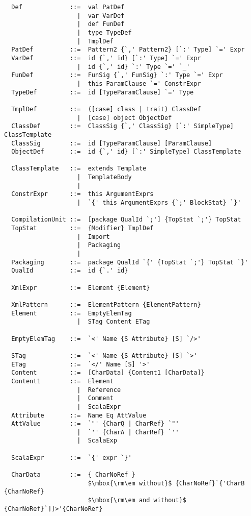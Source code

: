 \begin{lstlisting}
  Def             ::=  val PatDef
                    |  var VarDef
                    |  def FunDef
                    |  type TypeDef
                    |  TmplDef
  PatDef          ::=  Pattern2 {`,' Pattern2} [`:' Type] `=' Expr
  VarDef          ::=  id {`,' id} [`:' Type] `=' Expr
                    |  id {`,' id} `:' Type `=' `_'
  FunDef          ::=  FunSig {`,' FunSig} `:' Type `=' Expr
                    |  this ParamClause `=' ConstrExpr
  TypeDef         ::=  id [TypeParamClause] `=' Type

  TmplDef         ::=  ([case] class | trait) ClassDef
                    |  [case] object ObjectDef
  ClassDef        ::=  ClassSig {`,' ClassSig} [`:' SimpleType] ClassTemplate
  ClassSig        ::=  id [TypeParamClause] [ParamClause]
  ObjectDef       ::=  id {`,' id} [`:' SimpleType] ClassTemplate

  ClassTemplate   ::=  extends Template
                    |  TemplateBody
                    |
  ConstrExpr      ::=  this ArgumentExprs
                    |  `{' this ArgumentExprs {`;' BlockStat} `}'

  CompilationUnit ::=  [package QualId `;'] {TopStat `;'} TopStat
  TopStat         ::=  {Modifier} TmplDef
                    |  Import
                    |  Packaging
                    |
  Packaging       ::=  package QualId `{' {TopStat `;'} TopStat `}'
  QualId          ::=  id {`.' id}

  XmlExpr         ::=  Element {Element}

  XmlPattern      ::=  ElementPattern {ElementPattern}
  Element         ::=  EmptyElemTag
                    |  STag Content ETag                                       

  EmptyElemTag    ::=  `<' Name {S Attribute} [S] `/>'                         

  STag            ::=  `<' Name {S Attribute} [S] `>'                          
  ETag            ::=  `</' Name [S] '>'                                        
  Content         ::=  [CharData] {Content1 [CharData]}
  Content1        ::=  Element
                    |  Reference
                    |  Comment
                    |  ScalaExpr
  Attribute       ::=  Name Eq AttValue	                                 
  AttValue        ::=  `"' {CharQ | CharRef} `"'
                    |  `'' {CharA | CharRef} `''
                    |  ScalaExp

  ScalaExpr       ::=  `{' expr `}'

  CharData        ::=  { CharNoRef } 
                       $\mbox{\rm\em without}$ {CharNoRef}`{'CharB {CharNoRef} 
                       $\mbox{\rm\em and without}$ {CharNoRef}`]]>'{CharNoRef}


\end{lstlisting}
